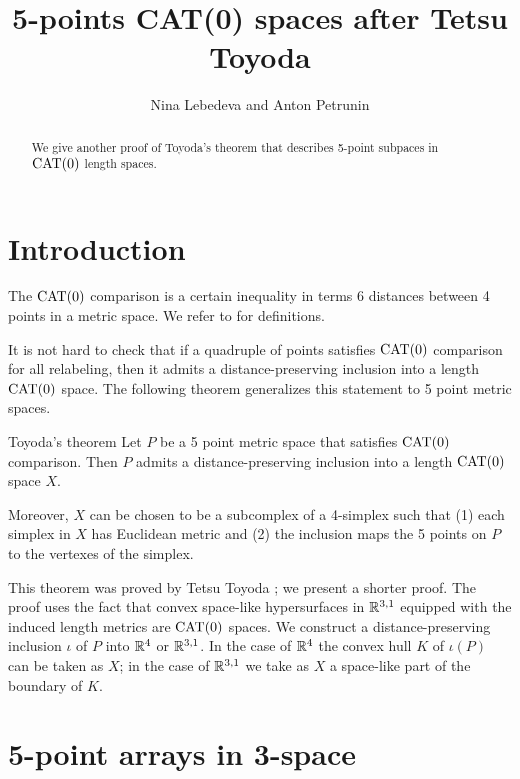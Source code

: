 \documentclass{article}
\begin{document}
\title{5-points CAT(0) spaces after  Tetsu Toyoda}
\author{Nina Lebedeva and Anton Petrunin}
\date{}
\maketitle
\begin{abstract}
We give another proof of Toyoda's theorem that describes 5-point subpaces in $\mathrm{CAT}(0)$ length spaces.
\end{abstract}

\section{Introduction}

The $\mathrm{CAT}(0)$ comparison is a certain inequality in terms 6 distances between 4 points in a metric space.
We refer to \cite{alexander-kapovitch-petrunin} for definitions.

It is not hard to check that if a quadruple of points satisfies $\mathrm{CAT}(0)$ comparison for all relabeling,
then it admits a distance-preserving inclusion into a length $\mathrm{CAT}(0)$ space.
The following theorem generalizes this statement to 5 point metric spaces.

\begin{thm}{Toyoda's theorem}
Let $P$ be a 5 point metric space that satisfies $\mathrm{CAT}(0)$ comparison.
Then $P$ admits a distance-preserving inclusion into a length $\mathrm{CAT}(0)$ space $X$.

Moreover,
$X$ can be chosen to be a subcomplex of a 4-simplex such that (1) each simplex in $X$ has Euclidean metric and (2) the inclusion maps the 5 points on $P$ to the vertexes of the simplex.
\end{thm}

This theorem was proved by Tetsu Toyoda \cite{toyoda};
we present a shorter proof.
The proof uses the fact that convex space-like hypersurfaces in $\mathbb{R}^{3,1}$ equipped with the induced length metrics are $\mathrm{CAT}(0)$ spaces.
We construct a distance-preserving inclusion $\iota$ of $P$ into $\mathbb{R}^4$ or $\mathbb{R}^{3,1}$.
In the case of $\mathbb{R}^4$ the convex hull $K$ of $\iota(P)$ can be taken as $X$;
in the case of $\mathbb{R}^{3,1}$ we take as $X$ a space-like part of the boundary of $K$.

\section{5-point arrays in 3-space}
\end{document}

